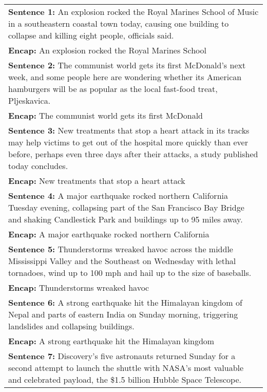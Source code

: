 \begin{table}
\caption{Sentences used in survey with corresponding encapsulations}
\small{
\begin{longtable}{|p{16 cm}|}
\hline
{\bf Sentence 1:} \singlespace An explosion rocked the Royal Marines School of Music in a southeastern coastal town today, causing one building to collapse and killing eight people, officials said.   \\
{\bf Encap:} An explosion rocked the Royal Marines School  \\ \hline
{\bf Sentence 2: }\singlespace The communist world gets its first McDonald's next week, and some people here are wondering whether its American hamburgers will be as popular as the local fast-food treat, Pljeskavica. \\
{\bf Encap:} The communist world gets its first McDonald  \\ \hline
{\bf Sentence 3:} \singlespace   New treatments that stop a heart attack in its tracks may help victims to get out of the hospital more quickly than ever before, perhaps even three days after their attacks, a study published today concludes.  \\
{\bf Encap:}   New treatments that stop a heart attack  \\
\hline
{\bf Sentence 4:} \singlespace  A major earthquake rocked northern California Tuesday evening, collapsing part of the San Francisco Bay Bridge and shaking Candlestick Park and buildings up to 95 miles away.  \\
{\bf Encap:}   A major earthquake rocked northern California  \\
\hline
{\bf Sentence 5:} \singlespace  Thunderstorms wreaked havoc across the middle Mississippi Valley and the Southeast on Wednesday with lethal tornadoes, wind up to 100 mph and hail up to the size of baseballs.  \\
{\bf Encap:}   Thunderstorms wreaked havoc  \\ \hline
{\bf Sentence 6:} \singlespace  A strong earthquake hit the Himalayan kingdom of Nepal and parts of eastern India on Sunday morning, triggering landslides and collapsing buildings. \\
{\bf Encap:}   A strong earthquake hit the Himalayan kingdom  \\ \hline
{\bf Sentence 7:} \singlespace   Discovery's five astronauts returned Sunday for a second attempt to launch the shuttle with NASA's most valuable and celebrated payload, the \$1.5 billion Hubble Space Telescope.   \\

\end{longtable}}
\end{table}

